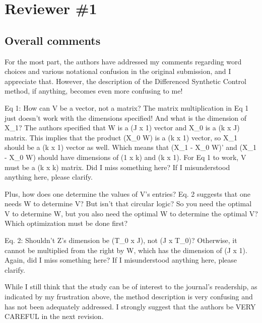 \section{Reviewer \#1}\label{reviewer_1}

\subsection*{Overall comments}


\RC{} For the most part, the authors have addressed my comments regarding word choices and various notational confusion in the original submission, and I appreciate that. However, the description of the Differenced Synthetic Control method, if anything, becomes even more confusing to me!

\RC{} Eq 1: How can V be a vector, not a matrix? The matrix multiplication in Eq 1 just doesn't work with the dimensions specified! And what is the dimension of X_1? The authors specified that W is a (J x 1) vector and X_0 is a (k x J) matrix. This implies that the product (X_0 W) is a (k x 1) vector, so X_1 should be a (k x 1) vector as well. Which means that (X_1 - X_0 W)' and (X_1 - X_0 W) should have dimensions of (1 x k) and (k x 1). For Eq 1 to work, V must be a (k x k) matrix. Did I miss something here? If I misunderstood anything here, please clarify.

\RC{} Plus, how does one determine the values of V's entries? Eq. 2 suggests that one needs W to determine V? But isn't that circular logic? So you need the optimal V to determine W, but you also need the optimal W to determine the optimal V? Which optimization must be done first?

\RC{} Eq. 2: Shouldn't Z's dimension be (T_0 x J), not (J x T_0)? Otherwise, it cannot be multiplied from the right by W, which has the dimension of (J x 1). Again, did I miss something here? If I misunderstood anything here, please clarify.

\RC{} While I still think that the study can be of interest to the journal's readership, as indicated by my frustration above, the method description is very confusing and has not been adequately addressed. I strongly suggest that the authors be VERY CAREFUL in the next revision.
